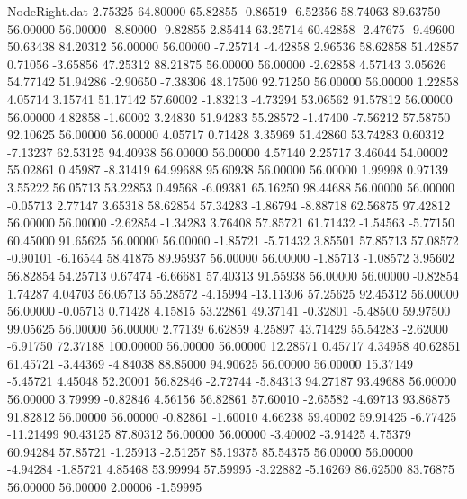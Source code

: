 \begin{filecontents}{NodeRight.dat}
   2.75325   64.80000   65.82855    -0.86519   -6.52356   58.74063   89.63750   56.00000   56.00000   -8.80000   -9.82855
   2.85414   63.25714   60.42858    -2.47675   -9.49600   50.63438   84.20312   56.00000   56.00000   -7.25714   -4.42858
   2.96536   58.62858   51.42857     0.71056   -3.65856   47.25312   88.21875   56.00000   56.00000   -2.62858    4.57143
   3.05626   54.77142   51.94286    -2.90650   -7.38306   48.17500   92.71250   56.00000   56.00000    1.22858    4.05714
   3.15741   51.17142   57.60002    -1.83213   -4.73294   53.06562   91.57812   56.00000   56.00000    4.82858   -1.60002
   3.24830   51.94283   55.28572    -1.47400   -7.56212   57.58750   92.10625   56.00000   56.00000    4.05717    0.71428
   3.35969   51.42860   53.74283     0.60312   -7.13237   62.53125   94.40938   56.00000   56.00000    4.57140    2.25717
   3.46044   54.00002   55.02861     0.45987   -8.31419   64.99688   95.60938   56.00000   56.00000    1.99998    0.97139
   3.55222   56.05713   53.22853     0.49568   -6.09381   65.16250   98.44688   56.00000   56.00000   -0.05713    2.77147
   3.65318   58.62854   57.34283    -1.86794   -8.88718   62.56875   97.42812   56.00000   56.00000   -2.62854   -1.34283
   3.76408   57.85721   61.71432    -1.54563   -5.77150   60.45000   91.65625   56.00000   56.00000   -1.85721   -5.71432
   3.85501   57.85713   57.08572    -0.90101   -6.16544   58.41875   89.95937   56.00000   56.00000   -1.85713   -1.08572
   3.95602   56.82854   54.25713     0.67474   -6.66681   57.40313   91.55938   56.00000   56.00000   -0.82854    1.74287
   4.04703   56.05713   55.28572    -4.15994  -13.11306   57.25625   92.45312   56.00000   56.00000   -0.05713    0.71428
   4.15815   53.22861   49.37141    -0.32801   -5.48500   59.97500   99.05625   56.00000   56.00000    2.77139    6.62859
   4.25897   43.71429   55.54283    -2.62000   -6.91750   72.37188  100.00000   56.00000   56.00000   12.28571    0.45717
   4.34958   40.62851   61.45721    -3.44369   -4.84038   88.85000   94.90625   56.00000   56.00000   15.37149   -5.45721
   4.45048   52.20001   56.82846    -2.72744   -5.84313   94.27187   93.49688   56.00000   56.00000    3.79999   -0.82846
   4.56156   56.82861   57.60010    -2.65582   -4.69713   93.86875   91.82812   56.00000   56.00000   -0.82861   -1.60010
   4.66238   59.40002   59.91425    -6.77425  -11.21499   90.43125   87.80312   56.00000   56.00000   -3.40002   -3.91425
   4.75379   60.94284   57.85721    -1.25913   -2.51257   85.19375   85.54375   56.00000   56.00000   -4.94284   -1.85721
   4.85468   53.99994   57.59995    -3.22882   -5.16269   86.62500   83.76875   56.00000   56.00000    2.00006   -1.59995

\end{filecontents}

